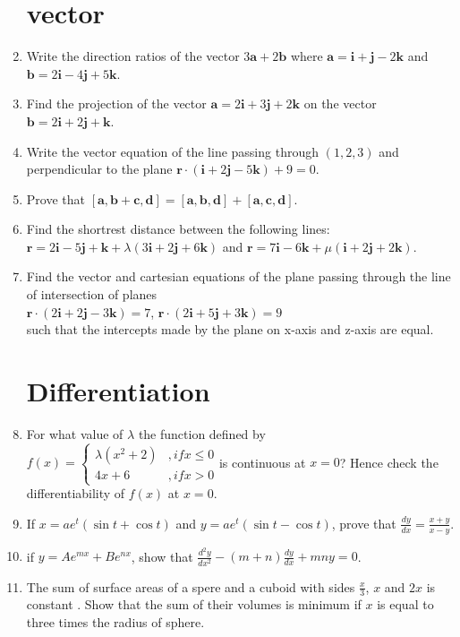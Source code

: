 \documentclass[10pt,-letter paper]{article}
\let\vec\mathbf{}
\let\vec\mathbf{}
\let\vec\mathbf{}
\providecommand{\brak}[1]{\ensuremath{\left(#1\right)}}
\begin{document}
\begin{enumerate}
\section{vector}
\item Write the direction ratios of the vector $3\vec{a}+2\vec{b}$ where $\vec{a} = \vec{i}+\vec{j}-2\vec{k}$ and $\vec{b} = 2\vec{i}-4\vec{j}+5\vec{k}$. \\
\item Find the projection of the vector $\vec{a}=2\vec{i}+3\vec{j}+2\vec{k}$ on the vector $\vec{b}=2\vec{i}+2\vec{j}+\vec{k}$. \\
\item Write the vector equation of the line passing through $\brak{1,2,3}$ and perpendicular to the plane $\vec{r}\cdot\brak{\vec{i}+2\vec{j}-5\vec{k}}+9=0$. \\
\item Prove that $[\vec{a},\vec{b}+\vec{c},\vec{d}] = [\vec{a},\vec{b},\vec{d}]+[\vec{a},\vec{c},\vec{d}]$.  \\
\item Find the shortrest distance between the following lines:\\
$\vec{r} = 2\vec{i}-5\vec{j}+\vec{k} +\lambda\brak{3\vec{i}+2\vec{j}+6\vec{k}}$ and $\vec{r} = 7\vec{i}-6\vec{k}+\mu\brak{\vec{i}+2\vec{j}+2\vec{k}}$. \\
\item Find the vector and cartesian equations of the plane passing through the line of intersection of planes \\
$\vec{r}\cdot\brak{2\vec{i}+2\vec{j}-3\vec{k}}=7$, \quad $\vec{r}\cdot\brak{2\vec{i}+5\vec{j}+3\vec{k}}=9$\\
such that the intercepts made by the plane on x-axis and z-axis are equal.\\
\section{Differentiation}
\item For what value of $\lambda$ the function defined by $f(x) = \begin{cases} \lambda\brak{x^2+2}&, if x \leq 0 \\ 4x+6&, if x>0 \end{cases}$is continuous at $x=0$? Hence check the differentiability of $f(x)$ at $x=0$. \\
\item If $x = ae^t\brak{\sin{t}+\cos{t}}$ and $y = ae^t\brak{\sin{t}-\cos{t}}$, prove that $\frac{dy}{dx}=\frac{x+y}{x-y}$. \\
\item if $y = Ae^{mx} + Be^{nx}$, show that $\frac{d^{2}y}{dx^2} -\brak{m+n}\frac{dy}{dx} + mny = 0$. \\
\item The sum of surface areas of a spere and a cuboid with sides $\frac{x}{3}$, $x$ and $2x$ is constant . Show that the sum of their volumes is minimum if $x$ is equal to three times the radius of sphere.\\

\end{enumerate}
\end{document}
